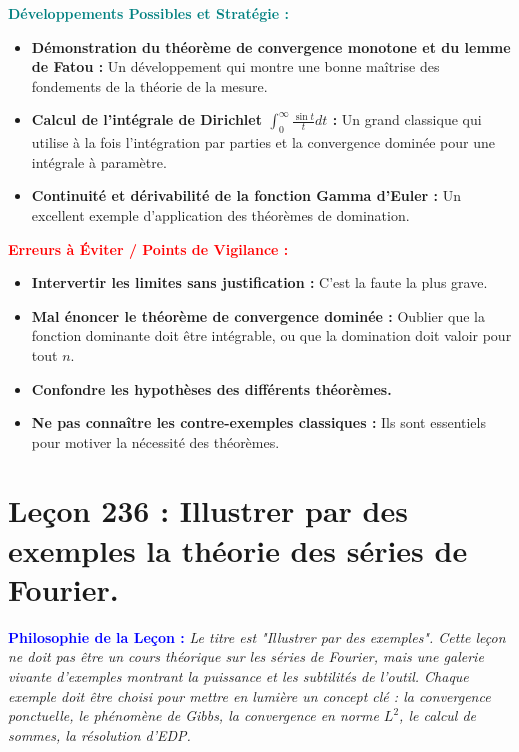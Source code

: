 \documentclass[12pt, a4paper, parskip=full]{report}
\theoremstyle{agregstyle}
\newenvironment{philosophie}
  {\par\medskip\noindent\begin{oframed}\noindent\textbf{\textcolor{blue}{Philosophie de la Leçon :}}\itshape}
  {\end{oframed}\par\medskip}
\newenvironment{developpements}
  {\par\medskip\noindent\begin{oframed}\noindent\textbf{\textcolor{teal}{Développements Possibles et Stratégie :}}}
  {\end{oframed}\par\medskip}
\newenvironment{erreurs}
  {\par\medskip\noindent\begin{oframed}\noindent\textbf{\textcolor{red}{Erreurs à Éviter / Points de Vigilance :}}}
  {\end{oframed}\par\medskip}
\begin{document}
\begin{developpements}
    \begin{itemize}
        \item \textbf{Démonstration du théorème de convergence monotone et du lemme de Fatou :} Un développement qui montre une bonne maîtrise des fondements de la théorie de la mesure.
        \item \textbf{Calcul de l'intégrale de Dirichlet $\int_0^\infty \frac{\sin t}{t} dt$ :} Un grand classique qui utilise à la fois l'intégration par parties et la convergence dominée pour une intégrale à paramètre.
        \item \textbf{Continuité et dérivabilité de la fonction Gamma d'Euler :} Un excellent exemple d'application des théorèmes de domination.
    \end{itemize}
\end{developpements}

\begin{erreurs}
    \begin{itemize}
        \item \textbf{Intervertir les limites sans justification :} C'est la faute la plus grave.
        \item \textbf{Mal énoncer le théorème de convergence dominée :} Oublier que la fonction dominante doit être intégrable, ou que la domination doit valoir pour tout $n$.
        \item \textbf{Confondre les hypothèses des différents théorèmes.}
        \item \textbf{Ne pas connaître les contre-exemples classiques :} Ils sont essentiels pour motiver la nécessité des théorèmes.
    \end{itemize}
\end{erreurs}
\chapter{Leçon 236 : Illustrer par des exemples la théorie des séries de Fourier.}

\begin{philosophie}
    Le titre est "Illustrer par des exemples". Cette leçon ne doit pas être un cours théorique sur les séries de Fourier, mais une galerie vivante d'exemples montrant la puissance et les subtilités de l'outil. Chaque exemple doit être choisi pour mettre en lumière un concept clé : la convergence ponctuelle, le phénomène de Gibbs, la convergence en norme $L^2$, le calcul de sommes, la résolution d'EDP.
\end{philosophie}
\end{document}
